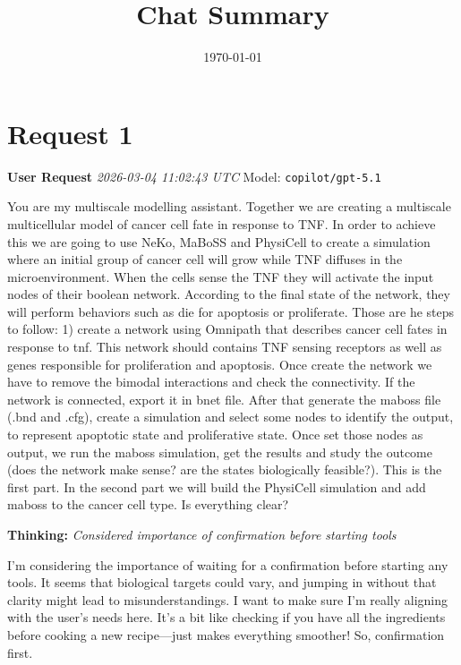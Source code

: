 \documentclass[11pt,a4paper]{article}
\title{Chat Summary}
\date{\today}
\begin{document}
\maketitle
\tableofcontents
\newpage

\section{Request 1}
\begin{userbox}
\textbf{User Request}
\quad \textit{2026-03-04 11:02:43 UTC}
\quad Model: \texttt{copilot/gpt-5.1}

You are my multiscale modelling assistant. Together we are creating a multiscale multicellular model of cancer cell fate in response to TNF. In order to achieve this we are going to use NeKo, MaBoSS and PhysiCell to create a simulation where an initial group of cancer cell will grow while TNF diffuses in the microenvironment. When the cells sense the TNF they will activate the input nodes of their boolean network. According to the final state of the network, they will perform behaviors such as die for apoptosis or proliferate. Those are he steps to follow: 1) create a network using Omnipath that describes cancer cell fates in response to tnf. This network should contains TNF sensing receptors as well as genes responsible for proliferation and apoptosis. Once create the network we have to remove the bimodal interactions and check the connectivity. If the network is connected, export it in bnet file. After that generate the maboss file (.bnd and .cfg), create a simulation and select some nodes to identify the output, to represent apoptotic state and proliferative state. Once set those nodes as output, we run the maboss simulation, get the results and study the outcome (does the network make
sense? are the states biologically feasible?). This is the first part. In the second part we will build the PhysiCell simulation and add maboss to the cancer cell type. Is everything clear?

\end{userbox}
\begin{thinkbox}
\textbf{Thinking:} \textit{Considered importance of confirmation before starting tools}

I'm considering the importance of waiting for a confirmation before starting any tools. It seems that biological targets could vary, and jumping in without that clarity might lead to misunderstandings. I want to make sure I’m really aligning with the user’s needs here. It’s a bit like checking if you have all the ingredients before cooking a new recipe—just makes everything smoother! So, confirmation first.

\end{thinkbox}
\end{document}
